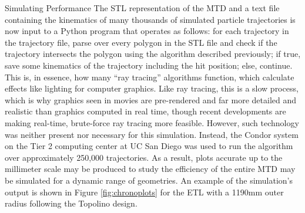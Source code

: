 \documentclass[oneside,12pt,final]{sty/ucthesis-CA2012}
\begin{document}
\begin{mainmatter}
\begin{section}{Simulating Performance}
The STL representation of the MTD and a text file containing the kinematics of many thousands of simulated particle trajectories is now input to a Python program that operates as follows: for each trajectory in the trajectory file, parse over every polygon in the STL file and check if the trajectory intersects the polygon using the algorithm described previously; if true, save some kinematics of the trajectory including the hit position; else, continue. This is, in essence, how many ``ray tracing'' algorithms\cite{raytrace} function, which calculate effects like lighting for computer graphics. Like ray tracing, this is a slow process, which is why graphics seen in movies are pre-rendered and far more detailed and realistic than graphics computed in real time, though recent developments are making real-time, brute-force ray tracing more feasible. However, such technology was neither present nor necessary for this simulation. Instead, the Condor\cite{condor} system on the Tier 2 computing center at UC San Diego was used to run the algorithm over approximately 250,000 trajectories. As a result, plots accurate up to the millimeter scale may be produced to study the efficiency of the entire MTD may be simulated for a dynamic range of geometries. An example of the simulation's output is shown in Figure \ref{fig:chronoplots} for the ETL with a 1190mm outer radius following the Topolino design.


\end{section}
\end{mainmatter}
\end{document}
